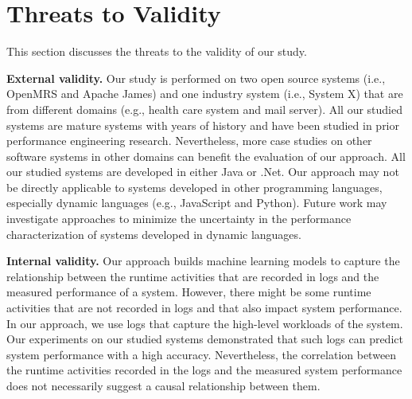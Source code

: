 \section{Threats to Validity} \label{sec:threats}


This section discusses the threats to the validity of our study.

\noindent \textbf{External validity.}
Our study is performed on two open source systems (i.e., OpenMRS and Apache James) and one industry system (i.e., System X) that are from different domains (e.g., health care system and mail server). 
All our studied systems are mature systems with years of history and have been studied in prior performance engineering research. Nevertheless, more case studies on other software systems in other domains can benefit the evaluation of our approach.
All our studied systems are developed in either Java or .Net. Our approach may not be directly applicable to systems developed in other programming languages, especially dynamic languages (e.g., JavaScript and Python). Future work may investigate approaches to minimize the uncertainty in the performance characterization of systems developed in dynamic languages.

\noindent \textbf{Internal validity.}
Our approach builds machine learning models to capture the relationship between the runtime activities that are recorded in logs and the measured performance of a system. 
However, there might be some runtime activities that are not recorded in logs and that also impact system performance.
In our approach, we use logs that capture the high-level workloads of the system. 
Our experiments on our studied systems demonstrated that such logs can predict system performance with a high accuracy.
Nevertheless, the correlation between the runtime activities recorded in the logs and the measured system performance does not necessarily suggest a causal relationship between them.


